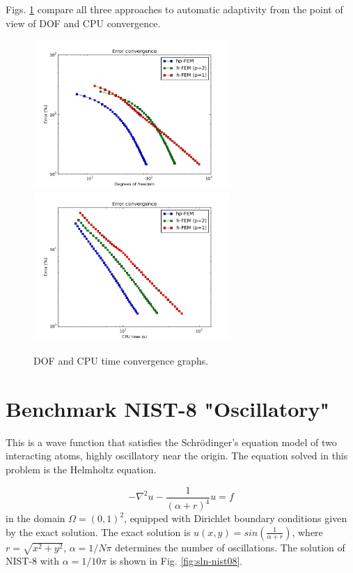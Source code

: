 \documentclass[12pt]{elsarticle}
\begin{document}
Figs. \ref{fig:nist-7-conv} compare all
three approaches to automatic adaptivity from the point
of view of DOF and CPU convergence.
\vspace{-5mm}

\begin{figure}[H]
\centering
\hspace{-50mm}
\includegraphics[width=7.5cm]{nist/nist-7/conv_dof_aniso.png}\ \
\hspace{-10mm}
\includegraphics[width=7.5cm]{nist/nist-7/conv_cpu_aniso.png}
\hspace{-50mm}
\caption{DOF and CPU time convergence graphs.}
\label{fig:nist-7-conv}
\vspace{-13mm}
\end{figure}


\section{Benchmark NIST-8 "Oscillatory"}
\label{sec:bench-8}

This is a wave function that satisfies the Schr\"{o}dinger's equation model of two
interacting atoms, highly oscillatory near the origin.
The equation solved in this problem is the Helmholtz equation.

\begin{equation} \label{oscillatory}
-\nabla^{2} u - \frac{1}{(\alpha + r)^{4}} u = f
\end{equation}
in the domain $\Omega = (0, 1)^2$, equipped with Dirichlet boundary conditions
given by the exact solution. The exact solution is
$u(x,y) = sin(\frac{1}{\alpha + r})$,
where $r = \sqrt{x^{2} + y^{2}}$, $\alpha = 1 / N \pi$ determines the number of oscillations.
The solution of NIST-8 with $\alpha = 1 / 10 \pi$ is shown in Fig. \ref{fig:sln-nist08}.
\end{document}
